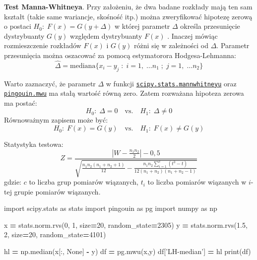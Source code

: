 \documentclass[polish,]{book}
\newenvironment{Shaded}{\begin{snugshade}}{\end{snugshade}}
\newcommand{\BuiltInTok}[1]{#1}
\newcommand{\DecValTok}[1]{\textcolor[rgb]{0.00,0.00,0.81}{#1}}
\newcommand{\FloatTok}[1]{\textcolor[rgb]{0.00,0.00,0.81}{#1}}
\newcommand{\ImportTok}[1]{#1}
\newcommand{\NormalTok}[1]{#1}
\newcommand{\OperatorTok}[1]{\textcolor[rgb]{0.81,0.36,0.00}{\textbf{#1}}}
\newcommand{\StringTok}[1]{\textcolor[rgb]{0.31,0.60,0.02}{#1}}
\newcommand{\VariableTok}[1]{\textcolor[rgb]{0.00,0.00,0.00}{#1}}
\begin{document}
\textbf{Test Manna-Whitneya}. Przy założeniu, że dwa badane rozkłady mają ten sam kształt (takie same wariancje, skośność itp.) można zweryfikować hipotezę zerową o postaci \(H_{0}:\;F(x)=G(y+\Delta)\) w której parametr \(\Delta\) określa przesunięcie dystrybuanty \(G(y)\) względem dystrybuanty \(F(x)\) \citep{med2018}. Inaczej mówiąc rozmieszczenie rozkładów \(F(x)\) i \(G(y)\) różni się w zależności od \(\Delta\). Parametr przesunięcia można oszacować za pomocą estymatorora Hodgesa-Lehmanna:
\begin{equation}
\hat{\Delta}=\mbox{mediana}\{x_i-y_j\;:\;i=1,\;\dots n_1\;;\;j=1,\;\dots n_2\}
\label{eq:mw01}
\end{equation}

Warto zaznaczyć, że parametr \(\Delta\) w funkcji \href{https://docs.scipy.org/doc/scipy/reference/generated/scipy.stats.mannwhitneyu.html\#scipy.stats.mannwhitneyu}{\texttt{scipy.stats.mannwhitneyu}} oraz \href{https://pingouin-stats.org/generated/pingouin.mwu.html\#pingouin.mwu}{\texttt{pingouin.mwu}} ma stałą wartość równą zero. Zatem rozważana hipoteza zerowa ma postać:
\begin{equation}
H_{0}:\;\Delta=0\quad\textrm{vs.}\quad H_{1}:\;\Delta\neq 0
\label{eq:mw02a}
\end{equation}
Równoważnym zapisem może być:
\begin{equation}
H_{0}:\;F(x)=G(y)\quad\textrm{vs.}\quad H_{1}:\;F(x)\neq G(y)
\label{eq:mw02b}
\end{equation}

Statystyka testowa:
\begin{equation}
Z=\frac{|W-\frac{n_1n_2}{2}|-0,5}{\sqrt{\frac{n_1n_2(n_1+n_2+1)}{12}-\frac{n_1n_2\sum_{i=1}^{c}(t^3-t)}{12(n_1+n_2)(n_1+n_2-1)}}}
\label{eq:mw03}
\end{equation}
gdzie: \(c\) to liczba grup pomiarów wiązanych, \(t_i\) to liczba pomiarów wiązanych w \(i\)-tej grupie pomiarów wiązanych.

\begin{Shaded}
\begin{Highlighting}[]
\ImportTok{import}\NormalTok{ scipy.stats }\ImportTok{as}\NormalTok{ stats}
\ImportTok{import}\NormalTok{ pingouin }\ImportTok{as}\NormalTok{ pg}
\ImportTok{import}\NormalTok{ numpy }\ImportTok{as}\NormalTok{ np}

\NormalTok{x }\OperatorTok{=}\NormalTok{ stats.norm.rvs(}\DecValTok{0}\NormalTok{, }\DecValTok{1}\NormalTok{, size}\OperatorTok{=}\DecValTok{20}\NormalTok{, random_state}\OperatorTok{=}\DecValTok{2305}\NormalTok{)}
\NormalTok{y }\OperatorTok{=}\NormalTok{ stats.norm.rvs(}\FloatTok{1.5}\NormalTok{, }\DecValTok{2}\NormalTok{, size}\OperatorTok{=}\DecValTok{20}\NormalTok{, random_state}\OperatorTok{=}\DecValTok{4101}\NormalTok{)}

\NormalTok{hl }\OperatorTok{=}\NormalTok{ np.median(x[:, }\VariableTok{None}\NormalTok{] }\OperatorTok{-}\NormalTok{ y)}
\NormalTok{df }\OperatorTok{=}\NormalTok{ pg.mwu(x,y)}
\NormalTok{df[}\StringTok{'LH-median'}\NormalTok{] }\OperatorTok{=}\NormalTok{ hl}
\BuiltInTok{print}\NormalTok{(df)}
\end{Highlighting}
\end{Shaded}
\end{document}

